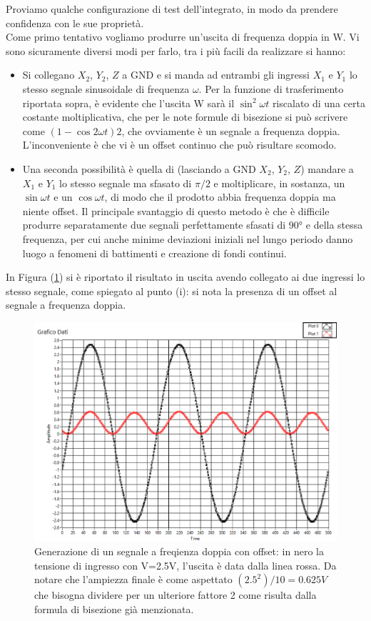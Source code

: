 \documentclass[10pt,letterpaper]{article}
\begin{document}
Proviamo qualche configurazione di test dell'integrato, in modo da prendere confidenza con le sue proprietà.\\
Come primo tentativo vogliamo produrre un'uscita di frequenza doppia in W. Vi sono sicuramente diversi modi per farlo, tra i più facili da realizzare si hanno:

\begin{itemize}
\item Si collegano $X_2$, $Y_2$, $Z$ a GND e si manda ad entrambi gli ingressi $X_1$ e $Y_1$ lo stesso segnale sinusoidale di frequenza $\omega$. Per la funzione di trasferimento riportata sopra, è evidente che l'uscita W sarà il $\sin^2 \omega t$ riscalato di una certa costante moltiplicativa, che per le note formule di bisezione si può scrivere come $(1- \cos 2\omega t)2$, che ovviamente è un segnale a frequenza doppia. L'inconveniente è che vi è un offset continuo che può risultare scomodo.

\item Una seconda possibilità è quella di (lasciando a GND $X_2$, $Y_2$, $Z$) mandare a $X_1$ e $Y_1$ lo stesso segnale ma sfasato di $\pi/2$ e moltiplicare, in sostanza, un $\sin \omega t$ e un $ \cos \omega t$, di modo che il prodotto abbia frequenza doppia ma niente offset. Il principale svantaggio di questo metodo è che è difficile produrre separatamente due segnali perfettamente sfasati di 90° e della stessa frequenza, per cui anche minime deviazioni iniziali nel lungo periodo danno luogo a fenomeni di battimenti e creazione di fondi continui.
\end{itemize} 


In Figura (\ref{fig:es19_sinquadro}) si è riportato il risultato in uscita avendo collegato ai due ingressi lo stesso segnale, come spiegato al punto (i): si nota la presenza di un offset al segnale a frequenza doppia.\\

\begin{figure}
\centering
\includegraphics[width=0.8\linewidth]{./es19_sinquadro}
\caption{Generazione di un segnale a freqienza doppia con offset: in nero la tensione di ingresso con V=2.5V, l'uscita è data dalla linea rossa. Da notare che l'ampiezza finale è come aspettato $(2.5^2)/10 = 0.625 V$ che bisogna dividere per un ulteriore fattore 2 come risulta dalla formula di bisezione già menzionata.}
\label{fig:es19_sinquadro}
\end{figure}
\end{document}
